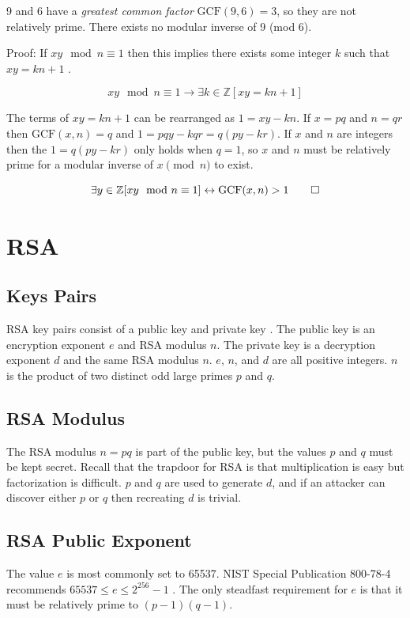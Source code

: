 \documentclass{book}
\begin{document}
9 and 6 have a \textit{greatest common factor} $\textrm{GCF}(9,6)=3$, so they are not relatively prime. There exists no modular inverse of 9 (mod 6).

Proof: If $xy \mod n \equiv 1$ then this implies there exists some integer $k$ such that $xy = kn + 1$ \cite{2101197}.

\[
xy \mod n \equiv 1 \to \exists k \in \mathbb{Z} [xy = kn + 1]
\]

The terms of $xy = kn + 1$ can be rearranged as $1 = xy - kn$. If $x=pq$ and $n=qr$ then $\textrm{GCF}(x,n)=q$ and $1 = pqy - kqr = q (py - kr)$. If $x$ and $n$ are integers then the $1 = q (py - kr)$ only holds when $q = 1$, so $x$ and $n$ must be relatively prime for a modular inverse of $x \pmod{n}$ to exist.

\[
\exists y \in \mathbb{Z} [xy \mod n \equiv 1] \leftrightarrow \textrm{GCF}(x,n)>1 \qed
\]

\section{RSA}

\subsection{Keys Pairs}

RSA key pairs consist of a public key and private key \cite{rfc8017}. The public key is an encryption exponent $e$ and RSA modulus $n$. The private key is a decryption exponent $d$ and the same RSA modulus $n$. $e$, $n$, and $d$ are all positive integers. $n$ is the product of two distinct odd large primes $p$ and $q$.

\subsection{RSA Modulus}
The RSA modulus $n = pq$ is part of the public key, but the values $p$ and $q$ must be kept secret. Recall that the trapdoor for RSA is that multiplication is easy but factorization is difficult. $p$ and $q$ are used to generate $d$, and if an attacker can discover either $p$ or $q$ then recreating $d$ is trivial.

\subsection{RSA Public Exponent}
The value $e$ is most commonly set to 65537. NIST Special Publication 800-78-4 recommends $65537 \le e \le 2^256 - 1$ \cite{Polk2015}. The only steadfast requirement for $e$ is that it must be relatively prime to $(p-1)(q-1)$.
\end{document}
